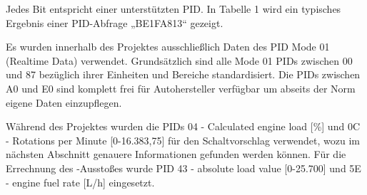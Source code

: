 Jedes Bit entspricht einer unterstützten PID. In Tabelle 1 wird ein typisches Ergebnis einer PID-Abfrage „BE1FA813“ gezeigt.

\begin{table}[!htb]
\centering
{}
\caption{Tabelle zur bitweisen Verarbeitung der Hexadezimal Zeichenkette \cite{SIMR.CH2-obd2.HextoBinary}}
\label{tableHextoPID}
\end{table}

Es wurden innerhalb des Projektes ausschließlich Daten des PID Mode 01 (Realtime Data) verwendet. Grundsätzlich sind alle Mode 01 PIDs zwischen 00 und 87 bezüglich ihrer Einheiten und Bereiche standardisiert. Die PIDs zwischen A0 und E0 sind komplett frei für Autohersteller verfügbar um abseits der Norm eigene Daten einzupflegen. 

Während des Projektes wurden die PIDs 04 - Calculated engine load [\%] und 0C - Rotations per Minute [0-16.383,75] für den Schaltvorschlag verwendet, wozu im nächsten Abschnitt genauere Informationen gefunden werden können. Für die Errechnung des -Ausstoßes wurde PID 43 - absolute load value [0-25.700] und 5E - engine fuel rate [L/h] eingesetzt.
\clearpage %